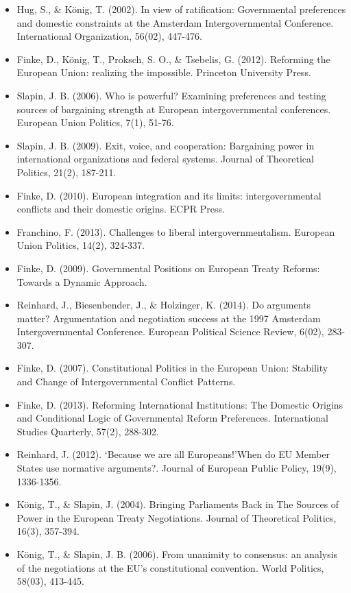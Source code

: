 \begin{itemize}
	\item Hug, S., \& K{\"o}nig, T. (2002). In view of ratification: Governmental preferences and domestic constraints at the Amsterdam Intergovernmental Conference. International Organization, 56(02), 447-476.
	\item Finke, D., K{\"o}nig, T., Proksch, S. O., \& Tsebelis, G. (2012). Reforming the European Union: realizing the impossible. Princeton University Press.
	\item Slapin, J. B. (2006). Who is powerful? Examining preferences and testing sources of bargaining strength at European intergovernmental conferences. European Union Politics, 7(1), 51-76.
	\item Slapin, J. B. (2009). Exit, voice, and cooperation: Bargaining power in international organizations and federal systems. Journal of Theoretical Politics, 21(2), 187-211.
	\item Finke, D. (2010). European integration and its limits: intergovernmental conflicts and their domestic origins. ECPR Press.
	\item Franchino, F. (2013). Challenges to liberal intergovernmentalism. European Union Politics, 14(2), 324-337.
	\item Finke, D. (2009). Governmental Positions on European Treaty Reforms: Towards a Dynamic Approach.
	\item Reinhard, J., Biesenbender, J., \& Holzinger, K. (2014). Do arguments matter? Argumentation and negotiation success at the 1997 Amsterdam Intergovernmental Conference. European Political Science Review, 6(02), 283-307.
	\item Finke, D. (2007). Constitutional Politics in the European Union: Stability and Change of Intergovernmental Conflict Patterns.
	\item Finke, D. (2013). Reforming International Institutions: The Domestic Origins and Conditional Logic of Governmental Reform Preferences. International Studies Quarterly, 57(2), 288-302.
	\item Reinhard, J. (2012). ‘Because we are all Europeans!’When do EU Member States use normative arguments?. Journal of European Public Policy, 19(9), 1336-1356.
	\item K{\"o}nig, T., \& Slapin, J. (2004). Bringing Parliaments Back in The Sources of Power in the European Treaty Negotiations. Journal of Theoretical Politics, 16(3), 357-394.
	\item K{\"o}nig, T., \& Slapin, J. B. (2006). From unanimity to consensus: an analysis of the negotiations at the EU's constitutional convention. World Politics, 58(03), 413-445.

\end{itemize}
